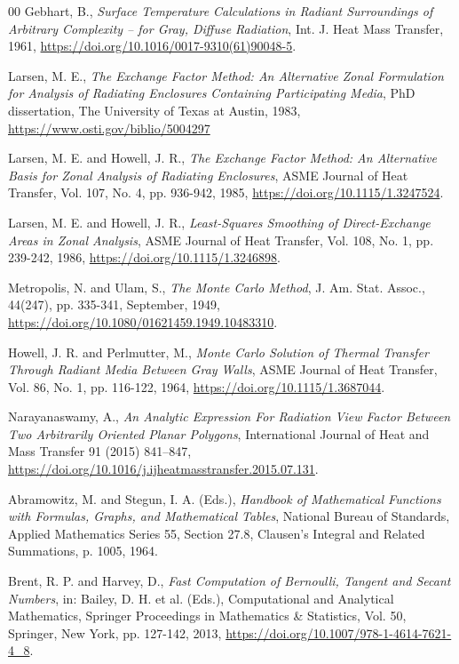\documentclass[preprint,1p,times]{elsarticle}
\theoremstyle{plain}
\theoremstyle{definition}
\theoremstyle{remark}
\begin{document}
\begin{thebibliography}{00}
	Gebhart, B.,
	\textit{Surface Temperature Calculations in Radiant Surroundings of Arbitrary Complexity -- for Gray, Diffuse Radiation},
	Int. J. Heat Mass Transfer,
	1961,
	\url{https://doi.org/10.1016/0017-9310(61)90048-5}.

	Larsen, M. E.,
	\textit{The Exchange Factor Method: An Alternative Zonal Formulation for Analysis of Radiating Enclosures Containing Participating Media},
	PhD dissertation, The University of Texas at Austin,
	1983,
	\url{https://www.osti.gov/biblio/5004297}

	Larsen, M. E. and Howell, J. R.,
	\textit{The Exchange Factor Method: An Alternative Basis for Zonal Analysis of Radiating Enclosures},
	ASME Journal of Heat Transfer,
	Vol. 107, No. 4, pp. 936-942, 1985,
	\url{https://doi.org/10.1115/1.3247524}.

	Larsen, M. E. and Howell, J. R.,
	\textit{Least-Squares Smoothing of Direct-Exchange Areas in Zonal Analysis},
	ASME Journal of Heat Transfer,
	Vol. 108, No. 1, pp. 239-242, 1986,
	\url{https://doi.org/10.1115/1.3246898}.
	
	Metropolis, N. and Ulam, S.,
	\textit{The Monte Carlo Method},
	J. Am. Stat. Assoc.,
	44(247), pp. 335-341, September,
	1949,
	\url{https://doi.org/10.1080/01621459.1949.10483310}.

	Howell, J. R. and Perlmutter, M.,
	\textit{Monte Carlo Solution of Thermal Transfer Through Radiant Media Between Gray Walls},
	ASME Journal of Heat Transfer,
	Vol. 86, No. 1, pp. 116-122, 1964,
	\url{https://doi.org/10.1115/1.3687044}.
	
	Narayanaswamy, A.,
	\textit{An Analytic Expression For Radiation View Factor Between Two Arbitrarily Oriented Planar Polygons},
	International Journal of Heat and Mass Transfer 91 (2015) 841–847,
	\url{https://doi.org/10.1016/j.ijheatmasstransfer.2015.07.131}.

	Abramowitz, M. and Stegun, I. A. (Eds.),
	\textit{Handbook of Mathematical Functions with Formulas, Graphs, and Mathematical Tables},
	National Bureau of Standards, Applied Mathematics Series 55,
	Section 27.8, Clausen's Integral and Related Summations, p. 1005,
	1964.

	Brent, R. P. and Harvey, D.,
	\textit{Fast Computation of Bernoulli, Tangent and Secant Numbers},
	in: Bailey, D. H. et al. (Eds.), Computational and Analytical Mathematics,
	Springer Proceedings in Mathematics \& Statistics, Vol. 50, Springer, New York,
	pp. 127-142, 2013,
	\url{https://doi.org/10.1007/978-1-4614-7621-4_8}.


\end{thebibliography}
\end{document}
